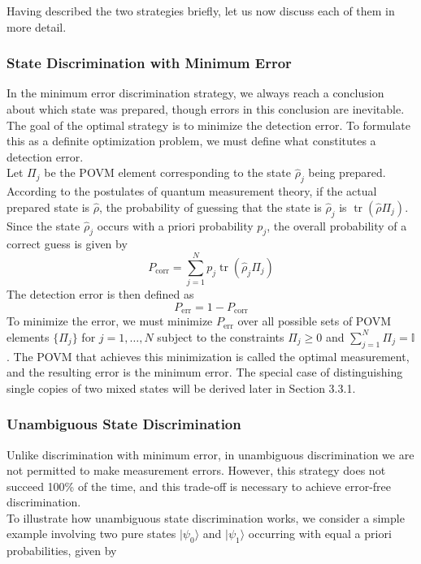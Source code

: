 Having described the two strategies briefly, let us now discuss each of them in more detail.

\subsubsection{State Discrimination with Minimum Error}
In the minimum error discrimination strategy, we always reach a conclusion about which state was prepared, though errors in this conclusion are inevitable. The goal of the optimal strategy is to minimize the detection error. To formulate this as a definite optimization problem, we must define what constitutes a detection error. \\

Let $\Pi_j$ be the POVM element corresponding to the state $\hat{\rho}_j$ being prepared. According to the postulates of quantum measurement theory, if the actual prepared state is $\hat{\rho}$, the probability of guessing that the state is $\hat{\rho}_j$ is $\operatorname{tr}(\hat{\rho} \Pi_j)$. Since the state $\hat{\rho}_j$ occurs with a priori probability $p_j$, the overall probability of a correct guess is given by 
\begin{equation}
    P_{\text{corr}} = \sum_{j=1}^N p_j \operatorname{tr}(\hat{\rho}_j \Pi_j)
\end{equation}
The detection error is then defined as 
\begin{equation}
    P_{\text{err}} = 1 - P_{\text{corr}}
\end{equation}
To minimize the error, we must minimize $P_{\text{err}}$ over all possible sets of POVM elements $\{\Pi_j\}$ for $j = 1, \ldots, N$ subject to the constraints $\Pi_j \geq 0$ and $\sum_{j=1}^N \Pi_j = \mathbb{I}$. The POVM that achieves this minimization is called the optimal measurement, and the resulting error is the minimum error. The special case of distinguishing single copies of two mixed states will be derived later in Section 3.3.1.

\subsubsection{Unambiguous State Discrimination}
Unlike discrimination with minimum error, in unambiguous discrimination we are not permitted to make measurement errors. However, this strategy does not succeed 100\% of the time, and this trade-off is necessary to achieve error-free discrimination.\\

To illustrate how unambiguous state discrimination works, we consider a simple example involving two pure states $|\psi_0\rangle$ and $|\psi_1\rangle$ occurring with equal a priori probabilities, given by

